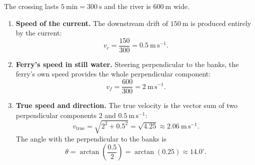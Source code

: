 \documentclass[11pt]{article}
\begin{document}
\begin{corrige}
The crossing lasts $5\ \mathrm{min} = 300\ \mathrm{s}$ and the river is $600\ \mathrm{m}$ wide.
\begin{enumerate}
\item \textbf{Speed of the current.} The downstream drift of $150\ \mathrm{m}$ is produced entirely by the current:
\[
v_c = \frac{150}{300} = 0.5\ \mathrm{m\,s^{-1}}.
\]
\item \textbf{Ferry's speed in still water.} Steering perpendicular to the banks, the ferry's own speed provides the whole perpendicular component:
\[
v_f = \frac{600}{300} = 2\ \mathrm{m\,s^{-1}}.
\]
\item \textbf{True speed and direction.} The true velocity is the vector sum of two perpendicular components $2$ and $0.5\ \mathrm{m\,s^{-1}}$:
\[
v_{\text{true}} = \sqrt{2^2 + 0.5^2} = \sqrt{4.25} \approx 2.06\ \mathrm{m\,s^{-1}}.
\]
The angle with the perpendicular to the banks is
\[
\theta = \arctan\!\left(\frac{0.5}{2}\right) = \arctan(0.25) \approx 14.0^{\circ}.
\]
\end{enumerate}
\end{corrige}
\end{document}
